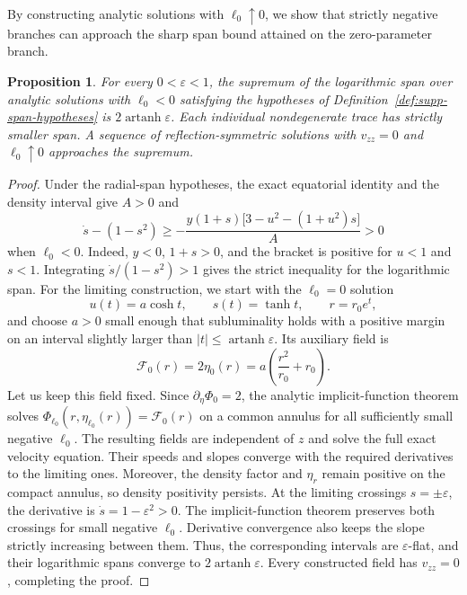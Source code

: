 \documentclass[11pt,a4paper]{article}
\numberwithin{equation}{section}
\theoremstyle{plain}
\newtheorem{proposition}{Proposition}
\theoremstyle{definition}
\theoremstyle{remark}
\newcommand{\ellzero}{\ell_0}
\begin{document}
By constructing analytic solutions with $\ell_0\uparrow 0$, we show that strictly negative branches can approach the sharp span bound attained on the zero-parameter branch.
\begin{proposition}\label{prop:strict-negative-l-asymptotic-sharpness}
For every $0<\varepsilon<1$, the supremum of the logarithmic span over analytic solutions with $\ellzero<0$ satisfying the hypotheses of Definition~\ref{def:supp-span-hypotheses} is $2\operatorname{artanh}\varepsilon$. Each individual nondegenerate trace has strictly smaller span. A sequence of reflection-symmetric solutions with $v_{zz}=0$ and $\ellzero\uparrow0$ approaches the supremum.
\end{proposition}
\begin{proof}
Under the radial-span hypotheses, the exact equatorial identity and the density interval give $A>0$ and
\begin{equation}\label{eq:supp-negative-slope-gap}
\dot s-(1-s^2)\geqslant-\frac{y(1+s)\bigl[3-u^2-(1+u^2)s\bigr]}{A}>0
\end{equation}
when $\ellzero<0$. Indeed, $y<0$, $1+s>0$, and the bracket is positive for $u<1$ and $s<1$. Integrating $\dot s/(1-s^2)>1$ gives the strict inequality for the logarithmic span. For the limiting construction, we start with the $\ellzero=0$ solution
\begin{equation}
u(t)=a\cosh t,\qquad s(t)=\tanh t,\qquad r=r_0e^t,
\end{equation}
and choose $a>0$ small enough that subluminality holds with a positive margin on an interval slightly larger than $|t|\leqslant\operatorname{artanh}\varepsilon$. Its auxiliary field is
\begin{equation}
\mathcal F_0(r)=2\eta_0(r)=a\left(\frac{r^2}{r_0}+r_0\right).
\end{equation}
Let us keep this field fixed. Since $\partial_\eta\Phi_0=2$, the analytic implicit-function theorem solves $\Phi_{\ellzero}(r,\eta_{\ellzero}(r))=\mathcal F_0(r)$ on a common annulus for all sufficiently small negative $\ellzero$. The resulting fields are independent of $z$ and solve the full exact velocity equation. Their speeds and slopes converge with the required derivatives to the limiting ones. Moreover, the density factor and $\eta_r$ remain positive on the compact annulus, so density positivity persists. At the limiting crossings $s=\pm\varepsilon$, the derivative is $\dot s=1-\varepsilon^2>0$. The implicit-function theorem preserves both crossings for small negative $\ellzero$. Derivative convergence also keeps the slope strictly increasing between them. Thus, the corresponding intervals are $\varepsilon$-flat, and their logarithmic spans converge to $2\operatorname{artanh}\varepsilon$. Every constructed field has $v_{zz}=0$, completing the proof.
\end{proof}
\end{document}
